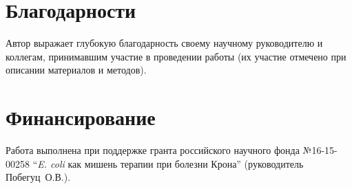 \chapter{Благодарности}
Автор выражает глубокую благодарность своему научному руководителю и коллегам, принимавшим участие в проведении работы (их участие отмечено при описании материалов и методов). 

\chapter{Финансирование}
Работа выполнена при поддержке гранта российского научного фонда №16-15-00258 ``\textit{E. coli} как мишень терапии при болезни Крона'' (руководитель Побегуц~О.В.).
